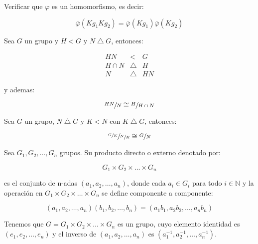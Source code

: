         \begin{ejercicio}
            Verificar que $\varphi$ es un homomorfismo, es decir:

            \begin{equation*}
                \bar{\varphi}(Kg_1 Kg_2) = \bar{\varphi}(Kg_1) \bar{\varphi}(Kg_2)
            \end{equation*}
        \end{ejercicio}

        \begin{teorema}
            Sea $G$ un grupo y $H < G$ y $N \bigtriangleup G$, entonces:

            \begin{eqnarray}
                HN & < & G \\
                H \cap N & \bigtriangleup & H \\
                N & \bigtriangleup & HN
            \end{eqnarray}

            y ademas:

            \begin{equation}
                \sfrac{HN}{N} \cong \sfrac{H}{H \cap N}
            \end{equation}
        \end{teorema}

        \begin{teorema}
            Sea $G$ un grupo, $N \bigtriangleup G$ y $K < N$ con $K \bigtriangleup G$, entonces:

            \begin{equation}
                \sfrac{\sfrac{G}{K}}{\sfrac{N}{K}} \cong \sfrac{G}{N}
            \end{equation}

            Sea $G_1, G_2, \dots, G_n$ grupos. Su producto directo o externo denotado por:

            \begin{equation}
                G_1 \times G_2 \times \dots \times G_n
            \end{equation}

            es el conjunto de n-adas $(a_1, a_2, \dots, a_n)$, donde cada $a_i \in G_i$ para todo $i \in \mathbb{N}$ y la operación en $G_1 \times G_2 \times \dots \times G_n$ se define componente a componente:

            \begin{equation}
                \left( a_1, a_2, \dots, a_n \right) \left( b_1, b_2, \dots, b_n \right) = \left( a_1 b_1, a_2 b_2, \dots, a_n b_n \right)
            \end{equation}

            Tenemos que $G = G_1 \times G_2 \times \dots \times G_n$ es un grupo, cuyo elemento identidad es $(e_1, e_2, \dots, e_n)$ y el inverso de $(a_1, a_2, \dots, a_n)$ es $(a_1^{-1}, a_2^{-1}, \dots, a_n^{-1})$.
        \end{teorema}


